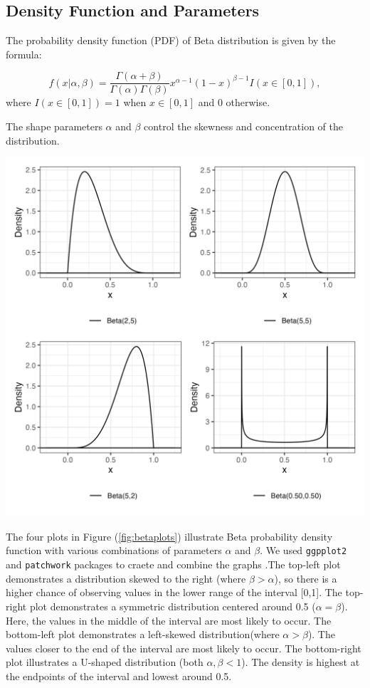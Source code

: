 \documentclass{article}\usepackage[]{graphicx}\usepackage[]{xcolor}
\newenvironment{Figure}
  {\par\medskip\noindent\minipage{\linewidth}}
  {\endminipage\par\medskip}
\begin{document}
\begin{multicols}{2}
\section{Density Function and Parameters}\label{sec:pdf}
The probability density function (PDF) of Beta distribution is given by the formula:

\[
 f(x | \alpha, \beta) = \frac{\Gamma(\alpha + \beta)}{\Gamma(\alpha)\Gamma(\beta)} x^{\alpha-1}(1-x)^{\beta-1} I(x \in [0,1]),
\]
where $I(x \in [0,1]) = 1$ when $x \in [0,1]$ and 0 otherwise.

The shape parameters $\alpha$ and $\beta$ control the skewness and concentration of the distribution.


\begin{Figure}
 \centering
 \includegraphics[width=\linewidth]{betaplots.png}
 \label{fig:betaplots}
\end{Figure}

The four plots in Figure (\ref{fig:betaplots}) illustrate Beta probability density function with various combinations of parameters $\alpha$ and $\beta$. We used \texttt{ggpplot2} and \texttt{patchwork} packages to craete and combine the graphs \citep{ggplot2, patchwork}.The top-left plot demonstrates a distribution skewed to the right (where $\beta > \alpha$), so there is a higher chance of observing values in the lower range of the interval [0,1]. The top-right plot demonstrates a symmetric distribution centered around 0.5 ($\alpha = \beta$). Here, the values in the middle of the interval are most likely to occur. The bottom-left plot demonstrates a left-skewed distribution(where $\alpha > \beta$). The values closer to the end of the interval are most likely to occur. The bottom-right plot illustrates a U-shaped distribution (both $\alpha, \beta < 1$). The density is highest at the endpoints of the interval and lowest around 0.5.



\end{multicols}
\end{document}
